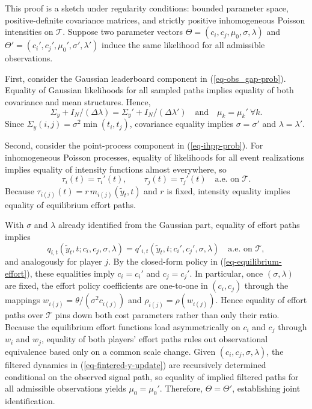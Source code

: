 \documentclass[mnsc]{informs3}
\begin{document}
\begin{APPENDICES}
This proof is a sketch under regularity conditions: bounded parameter space, positive-definite covariance matrices, and strictly positive inhomogeneous Poisson intensities on $\mathcal T$.
Suppose two parameter vectors $\Theta=(c_i,c_j,\mu_0,\sigma,\lambda)$ and $\Theta'=(c_i',c_j',\mu_0',\sigma',\lambda')$ induce the same likelihood for all admissible observations.

First, consider the Gaussian leaderboard component in (\ref{eq-obs_gap-prob}).
Equality of Gaussian likelihoods for all sampled paths implies equality of both covariance and mean structures.
Hence,
\[
\Sigma_y + I_N/(\Delta\lambda)=\Sigma_y' + I_N/(\Delta\lambda')
\quad\text{and}\quad
\mu_k=\mu_k'\ \forall k.
\]
Since $\Sigma_y(i,j)=\sigma^2\min(t_i,t_j)$, covariance equality implies $\sigma=\sigma'$ and $\lambda=\lambda'$.

Second, consider the point-process component in (\ref{eq-ihpp-prob}).
For inhomogeneous Poisson processes, equality of likelihoods for all event realizations implies equality of intensity functions almost everywhere, so
\[
\tau_i(t)=\tau_i'(t),\qquad \tau_j(t)=\tau_j'(t)\quad \text{a.e. on }\mathcal T.
\]
Because $\tau_{i(j)}(t)=r\,m_{i(j)}(\tilde y_t,t)$ and $r$ is fixed, intensity equality implies equality of equilibrium effort paths.

With $\sigma$ and $\lambda$ already identified from the Gaussian part, equality of effort paths implies
\[
q_{i,t}(\tilde y_t,t; c_i,c_j,\sigma,\lambda)=q'_{i,t}(\tilde y_t,t; c_i',c_j',\sigma,\lambda)
\quad\text{a.e. on }\mathcal T,
\]
and analogously for player $j$.
By the closed-form policy in (\ref{eq-equilibrium-effort}), these equalities imply $c_i=c_i'$ and $c_j=c_j'$.
In particular, once $(\sigma,\lambda)$ are fixed, the effort policy coefficients are one-to-one in $(c_i,c_j)$ through the mappings $w_{i(j)}=\theta/(\sigma^2c_{i(j)})$ and $\rho_{i(j)}=\rho(w_{i(j)})$.
Hence equality of effort paths over $\mathcal T$ pins down both cost parameters rather than only their ratio.
Because the equilibrium effort functions load asymmetrically on $c_i$ and $c_j$ through $w_i$ and $w_j$, equality of both players' effort paths rules out observational equivalence based only on a common scale change.
Given $(c_i,c_j,\sigma,\lambda)$, the filtered dynamics in (\ref{eq-fintered-y-update}) are recursively determined conditional on the observed signal path, so equality of implied filtered paths for all admissible observations yields $\mu_0=\mu_0'$.
Therefore, $\Theta=\Theta'$, establishing joint identification.
\Halmos
\endproof







\end{APPENDICES}
\end{document}
